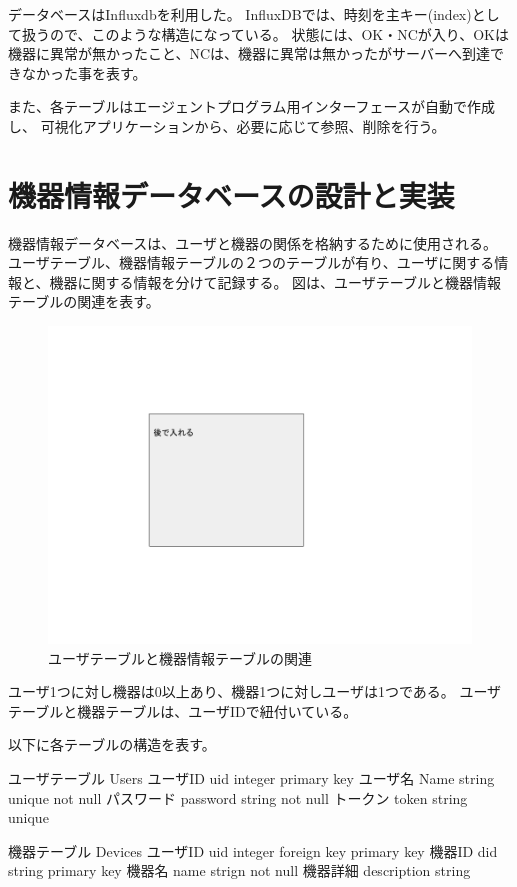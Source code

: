 データベースはInfluxdbを利用した。
InfluxDBでは、時刻を主キー(index)として扱うので、このような構造になっている。
状態には、OK・NCが入り、OKは機器に異常が無かったこと、NCは、機器に異常は無かったがサーバーへ到達できなかった事を表す。

また、各テーブルはエージェントプログラム用インターフェースが自動で作成し、
可視化アプリケーションから、必要に応じて参照、削除を行う。

\section{機器情報データベースの設計と実装}
機器情報データベースは、ユーザと機器の関係を格納するために使用される。
ユーザテーブル、機器情報テーブルの２つのテーブルが有り、ユーザに関する情報と、機器に関する情報を分けて記録する。
図は、ユーザテーブルと機器情報テーブルの関連を表す。
\begin{figure}[htbp]
\includegraphics[width=16cm]{images/test.png}
\caption{ユーザテーブルと機器情報テーブルの関連}
\label{fig:erdiagram}
\end{figure}
ユーザ1つに対し機器は0以上あり、機器1つに対しユーザは1つである。
ユーザテーブルと機器テーブルは、ユーザIDで紐付いている。

以下に各テーブルの構造を表す。

ユーザテーブル Users
ユーザID uid integer primary key
ユーザ名 Name string unique not null
パスワード password string not null
トークン token string unique

機器テーブル Devices
ユーザID uid integer foreign key primary key
機器ID did string primary key
機器名 name strign not null
機器詳細 description string

